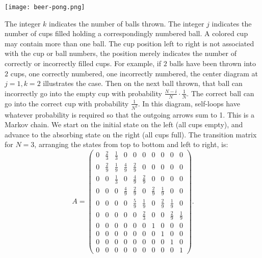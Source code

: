 \documentclass[12pt]{article}
\begin{document}
\begin{solution}
\begin{enumerate}[label=(\alph*)]
        \texttt{[image: beer-pong.png]}

        The integer \( k \) indicates the number of balls thrown.  The
        integer \( j \) indicates the number of cups filled holding a
        correspondingly numbered ball.  A colored cup may contain more
        than one ball.  The cup position left to right is not associated
        with the cup or ball numbers, the position merely indicates the
        number of correctly or incorrectly filled cups. For example, if \(
        2 \) balls have been thrown into \( 2 \) cups, one correctly
        numbered, one incorrectly numbered, the center diagram at
        \(j=1, k=2\)
        illustrates the case.  Then
        on the next ball thrown, that ball can incorrectly go into the
        empty cup with probability \( \frac{N-i}{N} \cdot \frac{1}{N} \).
        The correct ball can go into the correct cup with probability \(
        \frac{1}{N^2} \). In this diagram, self-loops have whatever
        probability is required so that the outgoing arrows sum to 1.
        This is a Markov chain.  We start on the initial state on the
        left (all cups empty), and advance to the absorbing state on the
        right (all cups full).  The transition matrix for \( N=3 \),
        arranging the states from top to bottom and left to right, is:
        \[
            A =
            \begin{pmatrix}
                0 & \frac{2}{3} & \frac{1}{3} & 0 & 0 & 0 & 0 & 0 & 0 &
                0\\
                0 & \frac{2}{9} & \frac{1}{9} & \frac{4}{9} & \frac{2}{9}
                & 0 & 0 & 0 & 0 & 0\\
                0 & 0 & \frac{1}{3} & 0 & \frac{4}{9} & \frac{2}{9} & 0
                & 0 & 0 & 0\\
                0 & 0 & 0 & \frac{4}{9} & \frac{2}{9} & 0 & \frac{2}{9}
                & \frac{1}{9} & 0 & 0\\
                0 & 0 & 0 & 0 & \frac{5}{9} & \frac{1}{9} & 0 & \frac{2}
                {9} & \frac{1}{9} & 0\\
                0 & 0 & 0 & 0 & 0 & \frac{2}{3} & 0 & 0 & \frac{2}{9} &
                \frac{1}{9}\\
                0 & 0 & 0 & 0 & 0 & 0 & 1 & 0 & 0 & 0\\
                0 & 0 & 0 & 0 & 0 & 0 & 0 & 1 & 0 & 0\\
                0 & 0 & 0 & 0 & 0 & 0 & 0 & 0 & 1 & 0\\
                0 & 0 & 0 & 0 & 0 & 0 & 0 & 0 & 0 & 1
            \end{pmatrix}
            .
        \]


\end{enumerate}
\end{solution}
\end{document}
